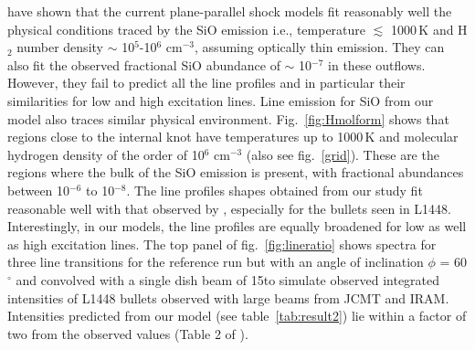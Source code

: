 \documentclass[useAMS,usenatbib]{mn2e}
\begin{document}
\cite{Nisini:2007p13128} have shown that the current
plane-parallel shock models fit reasonably well the physical
conditions traced by the SiO emission i.e., temperature $\lesssim$
1000\,K and H$_{2}$ number density $\sim$ 10$^{5}$-10$^{6}$
cm$^{-3}$, assuming optically thin emission. 
They can also fit the observed fractional SiO abundance of
$\sim$ 10$^{-7}$ in these outflows. However, they fail to predict all
the line profiles and in particular their similarities for low and
high excitation lines. Line emission for SiO from our model also traces similar
physical environment. Fig.~\ref{fig:Hmolform} shows that regions close
to the internal knot have temperatures up to 1000\,K and molecular
hydrogen density of the order of 10$^{6}$ cm$^{-3}$ (also see
fig.~\ref{grid}). These are the regions where the bulk of the SiO
emission is present, with fractional abundances between 10$^{-6}$ to 10$^{-8}$.
The line profiles shapes obtained from our study fit reasonable well with that observed by
\cite{Nisini:2007p13128}, especially for the bullets seen in
L1448. Interestingly, in our models, the line profiles are equally broadened for low as well
as high excitation lines. The top panel of fig.~\ref{fig:lineratio} shows spectra for three line
transitions for the reference run but with an angle of inclination
$\phi$ = 60$^{\circ}$ and convolved with a single dish beam of
15\arcsec to simulate observed integrated
intensities of L1448 bullets observed with large beams from JCMT and
IRAM. Intensities predicted from our model (see table~\ref{tab:result2}) lie within a factor of two
from the observed values (Table 2 of \citealt{Nisini:2007p13128}).
%
\end{document}
